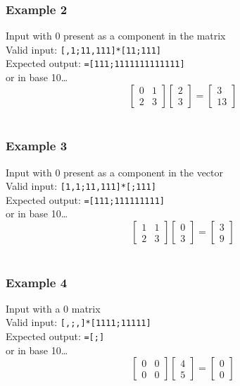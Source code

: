 \documentclass[letterpaper, 11pt]{article}
\begin{document}
\subsubsection{Example 2}
\label{sec:org209a398}
Input with 0 present as a component in the matrix\\
Valid input: \texttt{[,1;11,111]*[11;111]}\\
Expected output: \texttt{=[111;1111111111111]}\\
or in base 10\ldots{}\\
\[\begin{bmatrix}0&1\\2&3\end{bmatrix}\begin{bmatrix}2\\3\end{bmatrix} = \begin{bmatrix}3\\13\end{bmatrix}\]\\
\subsubsection{Example 3}
\label{sec:orgf740b56}
Input with 0 present as a component in the vector\\
Valid input: \texttt{[1,1;11,111]*[;111]}\\
Expected output: \texttt{=[111;111111111]}\\
or in base 10\ldots{}\\
\[\begin{bmatrix}1&1\\2&3\end{bmatrix}\begin{bmatrix}0\\3\end{bmatrix} = \begin{bmatrix}3\\9\end{bmatrix}\]\\
\subsubsection{Example 4}
\label{sec:org46b8daa}
Input with a 0 matrix\\
Valid input: \texttt{[,;,]*[1111;11111]}\\
Expected output: \texttt{=[;]}\\
or in base 10\ldots{}\\
\[\begin{bmatrix}0&0\\0&0\end{bmatrix}\begin{bmatrix}4\\5\end{bmatrix} = \begin{bmatrix}0\\0\end{bmatrix}\]\\
\end{document}
